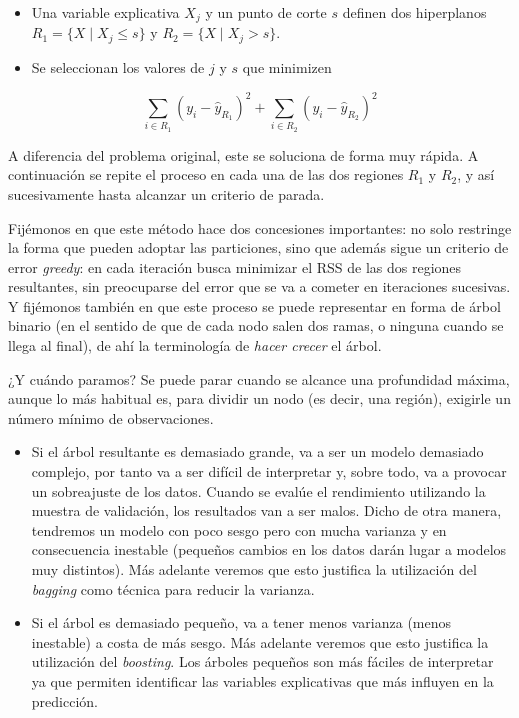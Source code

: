 \documentclass[
  spanish,
]{book}
\theoremstyle{break}
\theoremstyle{definition}
\theoremstyle{definition}
\theoremstyle{definition}
\theoremstyle{definition}
\theoremstyle{remark}
\begin{document}
\begin{itemize}
\item
  Una variable explicativa \(X_j\) y un punto de corte \(s\) definen dos hiperplanos
  \(R_1 = \{ X \mid X_j \le s \}\) y \(R_2 = \{ X \mid X_j > s \}\).
\item
  Se seleccionan los valores de \(j\) y \(s\) que minimizen
\end{itemize}

\[ \sum_{i\in R_1} (y_i - \widehat y_{R_1})^2 + \sum_{i\in R_2} (y_i - \widehat y_{R_2})^2\]

A diferencia del problema original, este se soluciona de forma muy rápida. A continuación
se repite el proceso en cada una de las dos regiones \(R_1\) y \(R_2\), y así sucesivamente
hasta alcanzar un criterio de parada.

Fijémonos en que este método hace dos concesiones importantes: no solo restringe la forma
que pueden adoptar las particiones, sino que además sigue un criterio de error \emph{greedy}:
en cada iteración busca minimizar el RSS de las dos regiones resultantes, sin preocuparse
del error que se va a cometer en iteraciones sucesivas. Y fijémonos también en que este
proceso se puede representar en forma de árbol binario (en el sentido de que de cada nodo
salen dos ramas, o ninguna cuando se llega al final), de ahí la terminología de \emph{hacer
crecer} el árbol.

¿Y cuándo paramos? Se puede parar cuando se alcance una profundidad máxima, aunque lo
más habitual es, para dividir un nodo (es decir, una región), exigirle un número mínimo
de observaciones.

\begin{itemize}
\item
  Si el árbol resultante es demasiado grande, va a ser un modelo demasiado complejo,
  por tanto va a ser difícil de interpretar y, sobre todo,
  va a provocar un sobreajuste de los datos. Cuando se evalúe el rendimiento utilizando
  la muestra de validación, los resultados van a ser malos. Dicho de otra manera, tendremos un
  modelo con poco sesgo pero con mucha varianza y en consecuencia inestable (pequeños
  cambios en los datos darán lugar a modelos muy distintos). Más adelante veremos que esto
  justifica la utilización del \emph{bagging} como técnica para reducir la varianza.
\item
  Si el árbol es demasiado pequeño, va a tener menos varianza (menos inestable) a costa
  de más sesgo. Más adelante veremos que esto justifica la utilización del \emph{boosting}. Los
  árboles pequeños son más fáciles de interpretar ya que permiten identificar las variables
  explicativas que más influyen en la predicción.
\end{itemize}
\end{document}
